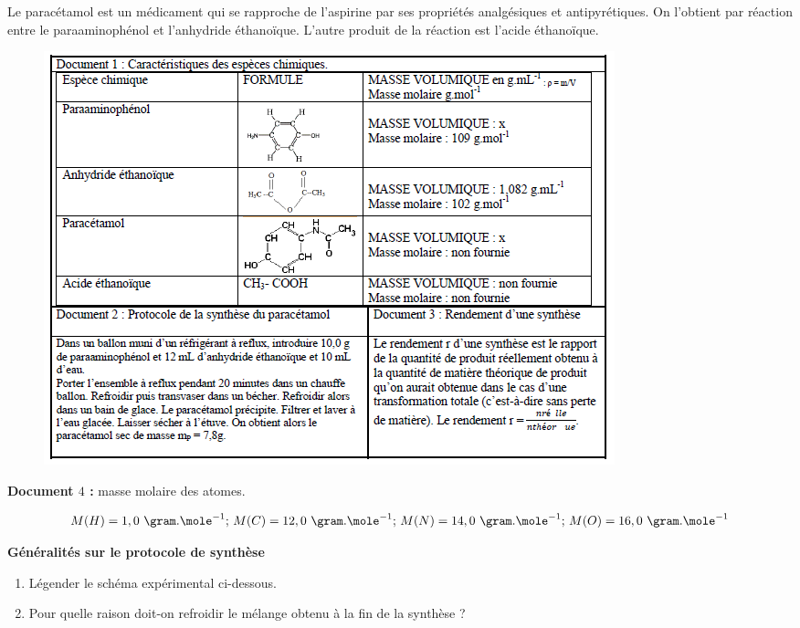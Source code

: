 \vspace{0.3cm}

Le paracétamol est un médicament qui se rapproche de l'aspirine par ses propriétés analgésiques et antipyrétiques. On l'obtient par réaction entre le paraaminophénol et l'anhydride éthanoïque. L'autre produit
de la réaction est l'acide éthanoïque.

\begin{figure}[h]
\begin{center}
\includegraphics[width=\columnwidth]{images/Exo4_Document_123}
\end{center}
\end{figure}

\vspace{0.3cm}

\textbf{Document $4$ :} masse molaire des atomes.

$$M(H) = 1,0\text{ }\gram.\mole^{-1}\text{; }M(C)=12,0\text{ }\gram.\mole^{-1}\text{; }M(N)=14,0\text{ }\gram.\mole^{-1}\text{; }M(O)=16,0\text{ }\gram.\mole^{-1}$$

\vspace{0.3cm}

\textbf{Généralités sur le protocole de synthèse}

\begin{enumerate}
\item Légender le schéma expérimental ci-dessous.
\item Pour quelle raison doit-on refroidir le mélange obtenu à la fin de la synthèse ?
\end{enumerate}

